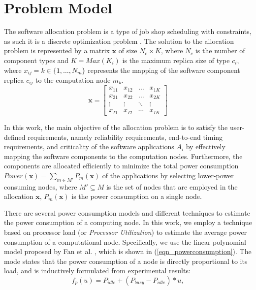 \section{Problem Model}\label{sec_extrafunc}
The software allocation problem is a type of job shop scheduling with constraints, as such it is a discrete optimization problem \cite{}. The solution to the allocation problem is represented by a matrix $\textbf{x}$ of size $N_c\times K$, where $N_c$ is the number of component types and $K=Max(K_i)$ is the maximum replica size of type $c_i$, where $x_{ij}=k\in \{1,…,N_m\}$ represents the mapping of the software component replica $c_{ij}$ to the computation node $m_k$.
\begin{equation}
\label{fig_pso_solution_representation}
\textbf{x}=
\begin{bmatrix} 
x_{11} & x_{12} & \dots & x_{1K}\\
x_{21} & x_{22} & \dots & x_{2K}\\
\vdots & \vdots & \ddots & \vdots\\
x_{I1} & x_{I2} & \cdots & x_{IK}
\end{bmatrix}
\end{equation}

In this work, the main objective of the allocation problem is to satisfy the user-defined requirements, namely reliability requirements, end-to-end timing requirements, and criticality of the software applications $A_i$ by effectively mapping the software components to the computation nodes. Furthermore, the components are allocated efficiently to minimize the total power consumption $Power(\textbf{x})=\sum_{m\in M'}{P_{m}(\textbf{x})}$ of the applications by selecting lower-power consuming nodes, where $M'\subseteq M$ is the set of nodes that are employed in the allocation $\textbf{x}$, $P_{m}(\textbf{x})$ is the power consumption on a single node.

There are several power consumption models and different techniques to estimate the power consumption of a computing node. In this work, we employ a technique based on processor load (or \textit{Processor Utilization}) to estimate the average power consumption of a computational node. Specifically, we use the linear polynomial model proposed by Fan et al. \cite{Fan2007PowerComputer}, which is shown in (\ref{eqn_powerconsumption}). The mode states that the power consumption of a node is directly proportional to its load, and is inductively formulated from experimental results:
\begin{equation}
\label{eqn_powerconsumption}
f_p(u)=P_{idle} + (P_{busy}-P_{idle})*u,
\end{equation}


